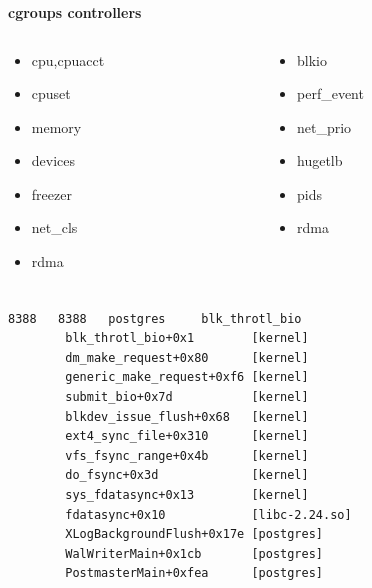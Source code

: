 \documentclass[usenames,dvipsnames, 18pt, compress, aspectratio=169]{beamer}
\begin{document}
\begin{frame}
    \frametitle{}
    \begin{center}
    \textbf{cgroups controllers}

    \begin{columns}
    \begin{column}{0.5\textwidth}
        \begin{itemize}[label={\MVRightarrow}]
            \item cpu,cpuacct
            \item cpuset
            \item memory
            \item devices
            \item freezer
            \item net\_cls
            \item rdma
        \end{itemize}
    \end{column}
    \begin{column}{0.5\textwidth}
        \begin{itemize}[label={\MVRightarrow}]
            \item blkio
            \item perf\_event
            \item net\_prio
            \item hugetlb
            \item pids
            \item rdma
        \end{itemize}
    \end{column}
    \end{columns}

    \end{center}
\end{frame}

\begin{frame}[fragile]{}
    \frametitle{}
    \begin{center}

        \vspace{0.3cm}
        \begin{verbatim}
8388   8388   postgres     blk_throtl_bio
        blk_throtl_bio+0x1        [kernel]
        dm_make_request+0x80      [kernel]
        generic_make_request+0xf6 [kernel]
        submit_bio+0x7d           [kernel]
        blkdev_issue_flush+0x68   [kernel]
        ext4_sync_file+0x310      [kernel]
        vfs_fsync_range+0x4b      [kernel]
        do_fsync+0x3d             [kernel]
        sys_fdatasync+0x13        [kernel]
        fdatasync+0x10            [libc-2.24.so]
        XLogBackgroundFlush+0x17e [postgres]
        WalWriterMain+0x1cb       [postgres]
        PostmasterMain+0xfea      [postgres]
        \end{verbatim}

    \end{center}
\end{frame}
\end{document}
